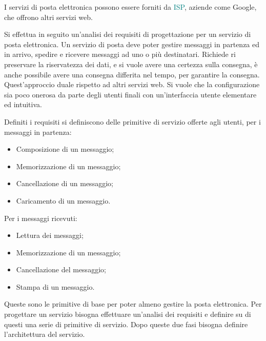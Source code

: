 \documentclass{article}
\numberwithin{equation}{subsection}
\begin{document}
I servizi di posta elettronica possono essere forniti da \textcolor{teal}{ISP}, aziende come Google, che offrono altri servizi web. 


Si effettua in seguito un'analisi dei requisiti di progettazione per un servizio di posta elettronica. 
Un servizio di posta deve poter gestire messaggi in partenza ed in arrivo, spedire e ricevere messaggi ad uno o più 
destinatari. Richiede ri preservare la riservatezza dei dati, e si vuole avere una certezza sulla consegna, è anche possibile avere una consegna 
differita nel tempo, per garantire la consegna. Quest'approccio duale rispetto ad altri servizi web. 
Si vuole che la configurazione sia poco onerosa da parte degli utenti finali con un'interfaccia utente 
elementare ed intuitiva. 


Definiti i requisiti si definiscono delle primitive di servizio offerte agli utenti, per i messaggi in partenza:
\begin{itemize}
    \item Composizione di un messaggio;
    \item Memorizzazione di un messaggio;
    \item Cancellazione di un messaggio;
    \item Caricamento di un messaggio. 
\end{itemize}
Per i messaggi ricevuti:
\begin{itemize}
    \item Lettura dei messaggi;
    \item Memorizzazione di un messaggio;
    \item Cancellazione del messaggio;
    \item Stampa di un messaggio. 
\end{itemize}



Queste sono le primitive di base per poter almeno gestire la posta elettronica. 
Per progettare un servizio bisogna effettuare un'analisi dei requisiti e definire su di questi una serie di primitive di servizio. Dopo queste due fasi bisogna 
definire l'architettura del servizio. 
\end{document}
